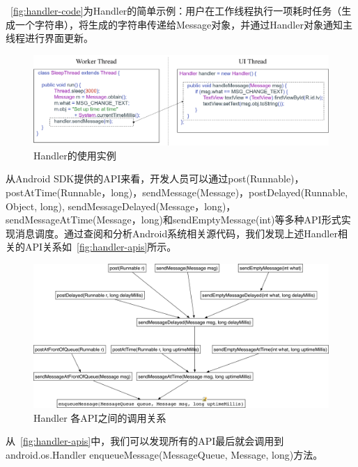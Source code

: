 ~\autoref{fig:handler-code}为Handler的简单示例：用户在工作线程执行一项耗时任务（生成一个字符串），将生成的字符串传递给Message对象，并通过Handler对象通知主线程进行界面更新。
 
 
\begin{figure}[h]
	\centering
	\includegraphics[width=\textwidth]{./Figures/handler-code.png}
	\caption{Handler的使用实例}
	\label{fig:handler-code}
\end{figure}


从Android SDK提供的API来看，开发人员可以通过post(Runnable)，postAtTime(Runnable，long)，sendMessage(Message)，postDelayed(Runnable, Object, long), sendMessageDelayed(Message，long)，sendMessageAtTime(Message，long)和sendEmptyMessage(int)等多种API形式实现消息调度。通过查阅和分析Android系统相关源代码，我们发现上述Handler相关的API关系如~\autoref{fig:handler-apis}所示。

 
 \begin{figure}[h]
	\centering
	\includegraphics[width=\textwidth]{./Figures/Handler-apis.png}
	\caption{ Handler 各API之间的调用关系}
	\label{fig:handler-apis}
\end{figure}


从~\autoref{fig:handler-apis}中，我们可以发现所有的API最后就会调用到android.os.Handler enqueueMessage(MessageQueue, Message, long)方法。

